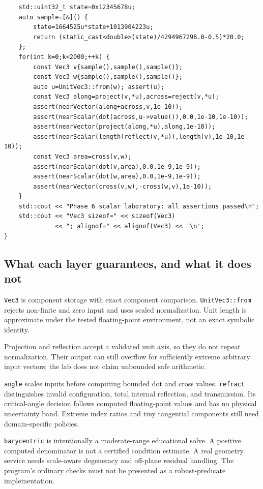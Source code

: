 \begin{verbatim}
    std::uint32_t state=0x12345678u;
    auto sample=[&]() {
        state=1664525u*state+1013904223u;
        return (static_cast<double>(state)/4294967296.0-0.5)*20.0;
    };
    for(int k=0;k<2000;++k) {
        const Vec3 v{sample(),sample(),sample()};
        const Vec3 w{sample(),sample(),sample()};
        auto u=UnitVec3::from(w); assert(u);
        const Vec3 along=project(v,*u),across=reject(v,*u);
        assert(nearVector(along+across,v,1e-10));
        assert(nearScalar(dot(across,u->value()),0.0,1e-10,1e-10));
        assert(nearVector(project(along,*u),along,1e-10));
        assert(nearScalar(length(reflect(v,*u)),length(v),1e-10,1e-10));
        const Vec3 area=cross(v,w);
        assert(nearScalar(dot(v,area),0.0,1e-9,1e-9));
        assert(nearScalar(dot(w,area),0.0,1e-9,1e-9));
        assert(nearVector(cross(v,w),-cross(w,v),1e-10));
    }
    std::cout << "Phase 6 scalar laboratory: all assertions passed\n";
    std::cout << "Vec3 sizeof=" << sizeof(Vec3)
              << "; alignof=" << alignof(Vec3) << '\n';
}
\end{verbatim}

\subsection{What each layer guarantees, and what it does not}\label{02-foundations-ii-ch037-what-each-layer-guarantees-and-what-it-does-not}

\texttt{Vec3} is component storage with exact component comparison. \texttt{UnitVec3::from} rejects non-finite and zero input and uses scaled normalization. Unit length is approximate under the tested floating-point environment, not an exact symbolic identity.

Projection and reflection accept a validated unit axis, so they do not repeat normalization. Their output can still overflow for sufficiently extreme arbitrary input vectors; the lab does not claim unbounded safe arithmetic.

\texttt{angle} scales inputs before computing bounded dot and cross values. \texttt{refract} distinguishes invalid configuration, total internal reflection, and transmission. Its critical-angle decision follows computed floating-point values and has no physical uncertainty band. Extreme index ratios and tiny tangential components still need domain-specific policies.

\texttt{barycentric} is intentionally a moderate-range educational solve. A positive computed denominator is not a certified condition estimate. A real geometry service needs scale-aware degeneracy and off-plane residual handling. The program's ordinary checks must not be presented as a robust-predicate implementation.


